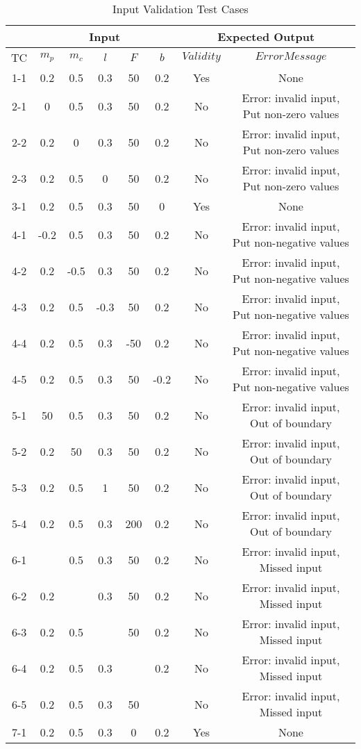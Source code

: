 \documentclass[12pt, titlepage]{article}
\begin{document}
\begin{table}
 \begin{tabular}{|c|c c c c c| c c|} 
 \hline
 \multicolumn{1}{l|}{}   & \multicolumn{5}{c|}{Input}                            & \multicolumn{2}{c}{Expected Output} \\ \hline
\hline
\multicolumn{1}{c|}{TC} &   $m_p$ & $m_c$ & $l$ & $F$ & $b$  &   $Validity$   &   $Error Message$ \\ \hline
1-1 &0.2 & 0.5& 0.3& 50& 0.2 & Yes & None\\
 \hline
2-1 &0 & 0.5& 0.3& 50& 0.2 & No & Error: invalid input, Put non-zero values  \\
 \hline
2-2 &0.2 & 0& 0.3& 50& 0.2& No & Error: invalid input, Put non-zero values \\
 \hline
2-3 &0.2 & 0.5& 0& 50& 0.2 &  No & Error: invalid input, Put non-zero values \\
 \hline
3-1 &0.2 & 0.5& 0.3& 50& 0 & Yes & None\\
 \hline
 4-1 &-0.2 & 0.5& 0.3& 50& 0.2&  No & Error: invalid input, Put non-negative values\\
 \hline
 4-2 &0.2 & -0.5& 0.3& 50& 0.2&   No & Error: invalid input, Put non-negative values\\
 \hline
 4-3 &0.2 & 0.5& -0.3& 50& 0.2&   No & Error: invalid input, Put non-negative values\\
 \hline
 4-4 &0.2 & 0.5& 0.3& -50& 0.2 &   No & Error: invalid input, Put non-negative values\\
 \hline
 4-5 &0.2 & 0.5& 0.3& 50& -0.2 &   No & Error: invalid input, Put non-negative values\\
 \hline
 5-1 & 50& 0.5& 0.3& 50& 0.2 & No & Error: invalid input, Out of boundary \\
 \hline
5-2 & 0.2& 50& 0.3& 50& 0.2 & No & Error: invalid input, Out of boundary \\
 \hline
5-3 & 0.2& 0.5& 1& 50& 0.2& No & Error: invalid input, Out of boundary \\
 \hline
5-4 & 0.2& 0.5& 0.3& 200& 0.2 & No & Error: invalid input, Out of boundary \\
 \hline
6-1 & & 0.5& 0.3& 50& 0.2 & No & Error: invalid input, Missed input \\
  \hline
6-2 &0.2 & &0.3 & 50& 0.2 & No & Error: invalid input, Missed input \\  \hline
 6-3 & 0.2& 0.5& & 50& 0.2 & No & Error: invalid input, Missed input \\
  \hline
  6-4 & 0.2& 0.5& 0.3& & 0.2 & No & Error: invalid input, Missed input \\
  \hline
   6-5 & 0.2& 0.5& 0.3& 50&  & No & Error: invalid input, Missed input \\
  \hline
 7-1 &0.2 & 0.5& 0.3& 0& 0.2& Yes & None\\
 \hline
\end{tabular}
\caption{\label{tbl_inputValidation}Input Validation Test Cases}
\end{table}		
\end{document}
